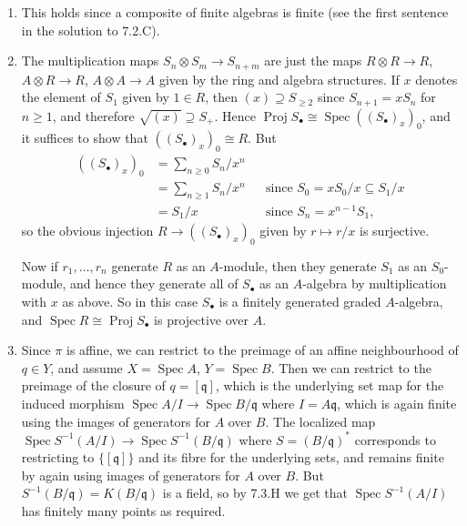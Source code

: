 \documentclass{report}
\newcommand{\rad}[1]{\sqrt{#1}} %
\newcommand{\q}{\mathfrak{q}}
\DeclareMathOperator{\Spec}{Spec}
\DeclareMathOperator{\Proj}{Proj}
\begin{document}
\begin{enumerate}[label=\textbf{7.3.\Alph*.}]
	\item This holds since a composite of finite algebras is finite (see the
	      first sentence in the solution to 7.2.C).

	\item The multiplication maps $S_n\otimes S_m\to S_{n+m}$ are just the
	      maps $R\otimes R\to R$, $A\otimes R\to R$, $A\otimes A\to A$ given by
	      the ring and algebra structures. If $x$ denotes the element of $S_1$
	      given by $1\in R$, then $(x)\supseteq S_{\ge2}$ since $S_{n+1}=xS_n$
	      for $n\ge1$, and therefore $\rad{(x)}\supseteq S_+$. Hence
	      $\Proj S_\bullet\cong\Spec((S_\bullet)_x)_0$, and it suffices to show
	      that $((S_\bullet)_x)_0\cong R$. But
	      \begin{align*}
		      ((S_\bullet)_x)_0
		       & = \sum_{n\ge0}S_n/x^n &  &                                          \\
		       & = \sum_{n\ge1}S_n/x^n &  & \text{since $S_0=xS_0/x\subseteq S_1/x$} \\
		       & = S_1/x               &  & \text{since $S_n=x^{n-1}S_1$},
	      \end{align*}
	      so the obvious injection $R\to((S_\bullet)_x)_0$ given by
	      $r\mapsto r/x$ is surjective.

	      Now if $r_1,\ldots,r_n$ generate $R$ as an $A$-module, then they
	      generate $S_1$ as an $S_0$-module, and hence they generate all of
	      $S_\bullet$ as an $A$-algebra by multiplication with $x$ as above. So
	      in this case $S_\bullet$ is a finitely generated graded $A$-algebra,
	      and $\Spec R\cong\Proj S_\bullet$ is projective over $A$.

	\item Since $\pi$ is affine, we can restrict to the preimage of an affine
	      neighbourhood of $q\in Y$, and assume $X=\Spec A$, $Y=\Spec B$. Then
	      we can restrict to the preimage of the closure of $q=[\q]$, which is
	      the underlying set map for the induced morphism
	      $\Spec A/I\to\Spec B/\q$ where $I=A\q$, which is again finite using
	      the images of generators for $A$ over $B$. The localized map
	      $\Spec S^{-1}(A/I)\to\Spec S^{-1}(B/\q)$ where $S=(B/\q)^*$
	      corresponds to restricting to $\{[\q]\}$ and its fibre for the
	      underlying sets, and remains finite by again using images of
	      generators for $A$ over $B$. But $S^{-1}(B/\q)=K(B/\q)$ is a field, so
	      by 7.3.H we get that $\Spec S^{-1}(A/I)$ has finitely many points as
	      required.


\end{enumerate}
\end{document}
